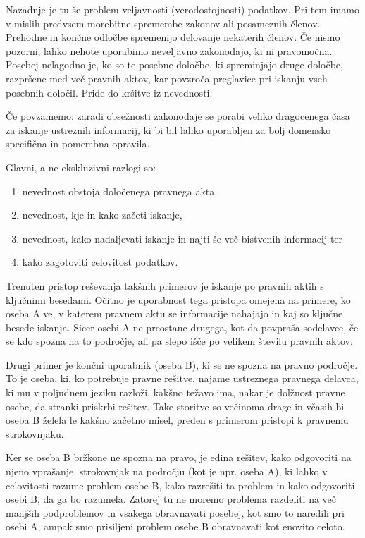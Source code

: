 \documentclass[a4paper,12pt,openright]{book}
\begin{document}
Nazadnje je tu še problem veljavnosti (verodostojnosti) podatkov. Pri tem imamo v mislih predvsem morebitne spremembe zakonov ali posameznih členov. Prehodne in končne odločbe spremenijo delovanje nekaterih členov. Če nismo pozorni, lahko nehote uporabimo neveljavno zakonodajo, ki ni pravomočna. Posebej nelagodno je, ko so te posebne določbe, ki spreminjajo druge določbe, razpršene med več pravnih aktov, kar povzroča preglavice pri iskanju vseh posebnih določil. Pride do kršitve iz nevednosti.

Če povzamemo: zaradi obsežnosti zakonodaje se porabi veliko dragocenega časa za iskanje ustreznih informacij, ki bi bil lahko uporabljen za bolj domensko specifična in pomembna opravila.

Glavni, a ne ekskluzivni razlogi so:
\begin{enumerate}
	\item nevednost obstoja določenega pravnega akta,
	\item nevednost, kje in kako začeti iskanje,
	\item nevednost, kako nadaljevati iskanje in najti še več bistvenih informacij ter
	\item kako zagotoviti celovitost podatkov.
\end{enumerate}

Trenuten pristop reševanja takšnih primerov je iskanje po pravnih aktih s ključnimi besedami. Očitno je uporabnost tega pristopa omejena na primere, ko oseba A ve, v katerem pravnem aktu se informacije nahajajo in kaj so ključne besede iskanja. Sicer osebi A ne preostane drugega, kot da povpraša sodelavce, če se kdo spozna na to področje, ali pa slepo išče po velikem številu pravnih aktov.

Drugi primer je končni uporabnik (oseba B), ki se ne spozna na pravno področje. To je oseba, ki, ko potrebuje pravne rešitve, najame ustreznega pravnega delavca, ki mu v poljudnem jeziku razloži, kakšno težavo ima, nakar je dolžnost pravne osebe, da stranki priskrbi rešitev. Take storitve so večinoma drage in včasih bi oseba B želela le kakšno začetno misel, preden s primerom pristopi k pravnemu strokovnjaku.

Ker se oseba B bržkone ne spozna na pravo, je edina rešitev, kako odgovoriti na njeno vprašanje, strokovnjak na področju (kot je npr. oseba A), ki lahko v celovitosti razume problem osebe B, kako razrešiti ta problem in kako odgovoriti osebi B, da ga bo razumela. Zatorej tu ne moremo problema razdeliti na več manjših podproblemov in vsakega obravnavati posebej, kot smo to naredili pri osebi A, ampak smo prisiljeni problem osebe B obravnavati kot enovito celoto.
\end{document}
